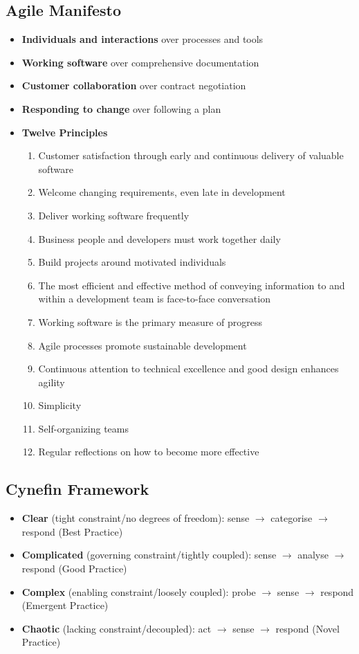 \documentclass{article}
\begin{document}
\subsection{Agile Manifesto}
\begin{itemize}
  \item \textbf{Individuals and interactions} over processes and tools
  \item \textbf{Working software} over comprehensive documentation
  \item \textbf{Customer collaboration} over contract negotiation
  \item \textbf{Responding to change} over following a plan
  \item \textbf{Twelve Principles}
        \begin{enumerate}
          \item Customer satisfaction through early and continuous delivery of valuable software
          \item Welcome changing requirements, even late in development
          \item Deliver working software frequently
          \item Business people and developers must work together daily
          \item Build projects around motivated individuals
          \item The most efficient and effective method of conveying information to and within a development team is face-to-face conversation
          \item Working software is the primary measure of progress
          \item Agile processes promote sustainable development
          \item Continuous attention to technical excellence and good design enhances agility
          \item Simplicity
          \item Self-organizing teams
          \item Regular reflections on how to become more effective
        \end{enumerate}
\end{itemize}

\subsection{Cynefin Framework}
\begin{itemize}
  \item \textbf{Clear} (tight constraint/no degrees of freedom): sense $\to$ categorise $\to$ respond (Best Practice)
  \item \textbf{Complicated} (governing constraint/tightly coupled): sense $\to$ analyse $\to$ respond (Good Practice)
  \item \textbf{Complex} (enabling constraint/loosely coupled): probe $\to$ sense $\to$ respond (Emergent Practice)
  \item \textbf{Chaotic} (lacking constraint/decoupled): act $\to$ sense $\to$ respond (Novel Practice)
\end{itemize}
\end{document}
